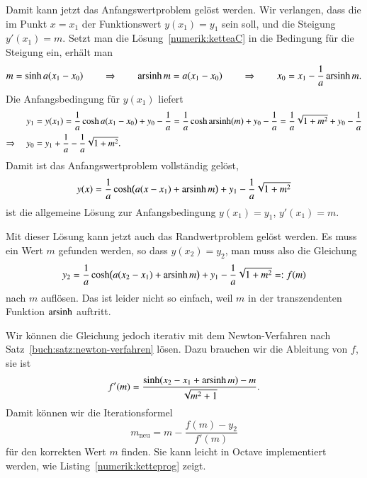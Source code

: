 \begin{loesung}
Damit kann jetzt das Anfangswertproblem gelöst werden.
Wir verlangen, dass die im Punkt $x=x_1$ der Funktionswert 
$y(x_1)=y_1$ sein soll, und die Steigung $y'(x_1)=m$.
Setzt man die Lösung~\eqref{numerik:ketteaC} in die Bedingung
für die Steigung ein, erhält man
\[
m=\sinh a(x_1-x_0)
\qquad\Rightarrow\qquad
\operatorname{arsinh} m =a(x_1-x_0)
\qquad\Rightarrow\qquad
x_0=x_1-\frac1a\operatorname{arsinh} m.
\]
Die Anfangsbedingung für $y(x_1)$ liefert
\begin{align*}
y_1
&=
y(x_1)
=
\frac1a\cosh a(x_1-x_0) + y_0 - \frac1a
=
\frac1a\cosh \operatorname{arsinh}(m)+y_0-\frac1a
=
\frac1a\sqrt{1+m^2}+y_0-\frac1a
\\
\Rightarrow\quad
y_0
&= 
y_1+\frac1a-\frac1a\sqrt{1+m^2}.
\end{align*}
Damit ist das Anfangswertproblem vollständig gelöst, 
\begin{equation}
y(x)
=
\frac1a\cosh \bigl(a(x-x_1) + \operatorname{arsinh} m\bigr)
+ y_1 - \frac1a\sqrt{1+m^2}
\end{equation}
ist die allgemeine Lösung zur Anfangsbedingung $y(x_1)=y_1$, $y'(x_1)=m$.

Mit dieser Lösung kann jetzt auch das Randwertproblem gelöst werden.
Es muss ein Wert $m$ gefunden werden, so dass $y(x_2)=y_2$,
man muss also die Gleichung
\[
y_2
=
\frac1a\cosh \bigl(a(x_2-x_1)+\operatorname{arsinh} m\bigr) + y_1 - \frac1a\sqrt{1+m^2}
=:
f(m)
\]
nach $m$ auflösen.
Das ist leider nicht so einfach, weil $m$ in der transzendenten Funktion
$\operatorname{arsinh}$ auftritt.

Wir können die Gleichung jedoch iterativ mit dem Newton-Verfahren
nach Satz~\ref{buch:satz:newton-verfahren} lösen.
Dazu brauchen wir die Ableitung von $f$, sie ist
\[
f'(m)
=
\frac{ \sinh (x_2-x_1+\operatorname{arsinh} m) -m}{\sqrt{m^2+1}}.
\]
Damit können wir die Iterationsformel
\[
m_{\text{neu}} = m - \frac{f(m) - y_2}{f'(m)}
\]
für den korrekten Wert $m$ finden.
Sie kann leicht in Octave implementiert werden, wie Listing~\ref{numerik:ketteprog} zeigt.


\end{loesung}
